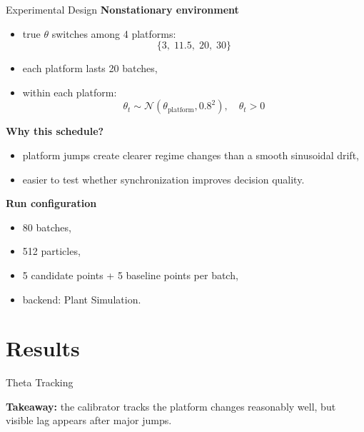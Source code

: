 \documentclass[aspectratio=169,11pt]{beamer}
\begin{document}
\begin{frame}{Experimental Design}
    \textbf{Nonstationary environment}
    \begin{itemize}
        \item true $\theta$ switches among 4 platforms:
        \[
        \{3,\;11.5,\;20,\;30\}
        \]
        \item each platform lasts 20 batches,
        \item within each platform:
        \[
        \theta_t \sim \mathcal{N}(\theta_{\text{platform}}, 0.8^2), \quad \theta_t > 0
        \]
    \end{itemize}

    \vspace{0.3cm}
    \textbf{Why this schedule?}
    \begin{itemize}
        \item platform jumps create clearer regime changes than a smooth sinusoidal drift,
        \item easier to test whether synchronization improves decision quality.
    \end{itemize}

    \vspace{0.3cm}
    \textbf{Run configuration}
    \begin{itemize}
        \item 80 batches,
        \item 512 particles,
        \item 5 candidate points + 5 baseline points per batch,
        \item backend: Plant Simulation.
    \end{itemize}
\end{frame}

\section{Results}

\begin{frame}{Theta Tracking}
    \begin{center}
    \end{center}

    \textbf{Takeaway:}
    the calibrator tracks the platform changes reasonably well, but visible lag appears after major jumps.
\end{frame}
\end{document}
